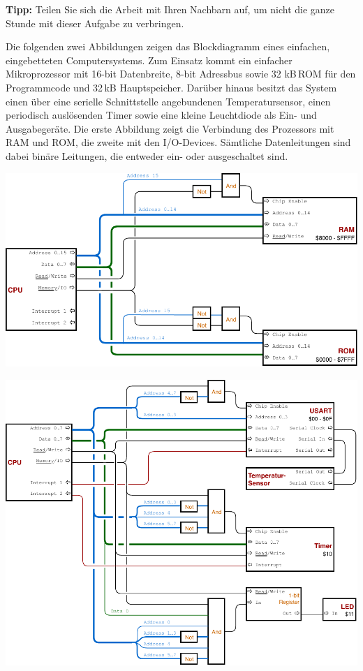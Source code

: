 \textbf{Tipp:} Teilen Sie sich die Arbeit mit Ihren Nachbarn auf, um nicht die
ganze Stunde mit dieser Aufgabe zu verbringen. \smiley

\bigskip
\teilaufgabe
Die folgenden zwei Abbildungen zeigen das Blockdiagramm eines einfachen,
eingebetteten Computersystems. Zum Einsatz kommt ein einfacher Mikroprozessor
mit 16-bit Datenbreite, 8-bit Adressbus sowie 32 kB\,ROM für den Programmcode
und 32\,kB Hauptspeicher. Darüber hinaus besitzt das System einen über eine
serielle Schnittstelle angebundenen Temperatursensor, einen periodisch
auslösenden Timer sowie eine kleine Leuchtdiode als Ein- und Ausgabegeräte.
Die erste Abbildung zeigt die Verbindung des Prozessors mit RAM und ROM, die
zweite mit den I/O-Devices. Sämtliche Datenleitungen sind dabei binäre Leitungen,
die entweder ein- oder ausgeschaltet sind.

\bigskip
\includegraphics[width=\textwidth]{1-grundlagen/img/aufgabe-rechnerarchitektur-1}

\includegraphics[width=\textwidth]{1-grundlagen/img/aufgabe-rechnerarchitektur-2}
\bigskip

